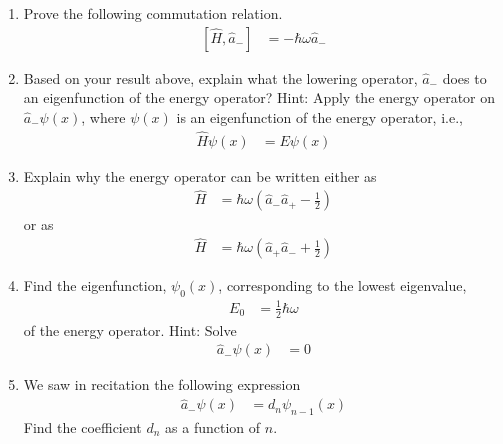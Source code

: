 \documentclass[fleqn, a4paper, 11pt, oneside]{amsart}
\theoremstyle{definition}
\theoremstyle{theorem}
\begin{document}
\begin{question}
	\begin{enumerate}
		\item
			Prove the following commutation relation.
			\begin{align*}
				\left[ \hat{H} , \hat{a}_- \right] & = -\hbar \omega \hat{a}_-
			\end{align*}
		\item
			Based on your result above, explain what the lowering operator, $\hat{a}_-$ does to an eigenfunction of the energy operator?
			Hint: Apply the energy operator on $\hat{a}_- \psi(x)$, where $\psi(x)$ is an eigenfunction of the energy operator, i.e.,
			\begin{align*}
				\hat{H} \psi(x) & = E \psi(x)
			\end{align*}
		\item
			Explain why the energy operator can be written either as
			\begin{align*}
				\hat{H} & = \hbar \omega \left( \hat{a}_- \hat{a}_+ - \frac{1}{2} \right)
			\end{align*}
			or as
			\begin{align*}
				\hat{H} & = \hbar \omega \left( \hat{a}_+ \hat{a}_- + \frac{1}{2} \right)
			\end{align*}
		\item
			Find the eigenfunction, $\psi_0(x)$, corresponding to the lowest eigenvalue,
			\begin{align*}
				E_0 & = \frac{1}{2} \hbar \omega
			\end{align*}
			of the energy operator.
			Hint: Solve
			\begin{align*}
				\hat{a}_- \psi(x) & = 0
			\end{align*}
		\item
			We saw in recitation the following expression
			\begin{align*}
				\hat{a}_- \psi(x) & = d_n \psi_{n - 1}(x)
			\end{align*}
			Find the coefficient $d_n$ as a function of $n$.
	\end{enumerate}
\end{question}
\end{document}
